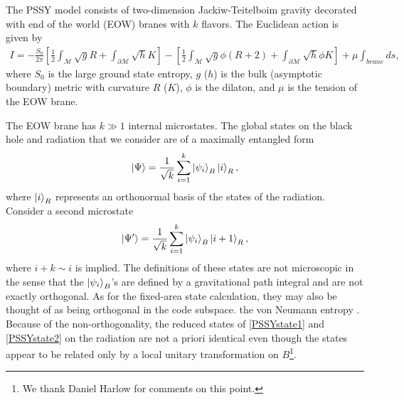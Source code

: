 \documentclass[a4paper,11pt]{article}
\begin{document}
The PSSY model consists of two-dimension Jackiw-Teitelboim gravity decorated with end of the world (EOW) branes with $k$ flavors. The Euclidean action is given by
\begin{align}
    I = -\frac{S_0}{2\pi}\left[\frac{1}{2}\int_{\mathcal{M}}\sqrt{g}R+ \int_{\partial \mathcal{M}}\sqrt{h}K \right]-\left[\frac{1}{2}\int_{\mathcal{M}}\sqrt{g}\phi(R+2)+\int_{\partial \mathcal{M}}\sqrt{h}\phi K \right] +\mu \int_{brane}ds,
\end{align}
where $S_0$ is the large ground state entropy, $g$ ($h$) is the bulk (asymptotic boundary) metric with curvature $R$ ($K$), $\phi$ is the dilaton, and $\mu$ is the tension of the EOW brane.

The EOW brane has $k \gg 1$ internal microstates. The global states on the black hole and radiation that we consider are of a maximally entangled form
\begin{align}
    \ket{\Psi} = \frac{1}{\sqrt{k}}\sum_{i = 1}^k \ket{\psi_i}_B\ket{i}_R,
    \label{PSSYstate1}
\end{align}
where $\ket{i}_R$ represents an orthonormal basis of the states of the radiation. Consider a second microstate
\begin{align}
    \ket{\Psi'} = \frac{1}{\sqrt{k}}\sum_{i = 1}^k \ket{\psi_i}_B\ket{i+1}_R,
    \label{PSSYstate2}
\end{align}
where $i+k \sim i$ is implied. The definitions of these states are not microscopic in the sense that the $\ket{\psi_i}_B$'s are defined by a gravitational path integral and are not exactly orthogonal. As for the fixed-area state calculation, they may also be thought of as being orthogonal in the code subspace. 
the von Neumann entropy \cite{2019arXiv191111977P}.
Because of the non-orthogonality, the reduced states of \eqref{PSSYstate1} and \eqref{PSSYstate2} on the radiation are not a priori identical even though the states appear to be related only by a local unitary transformation on $B$\footnote{We thank Daniel Harlow for comments on this point.}. 
\end{document}
